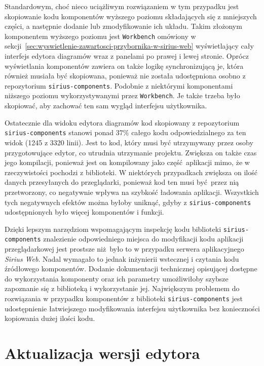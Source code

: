 Standardowym, choć nieco uciążliwym rozwiązaniem w tym przypadku jest
skopiowanie kodu komponentów wyższego poziomu składających się z mniejszych
części, a następnie dodanie lub zmodyfikowanie ich układu. Takim złożonym
komponentem wyższego poziomu jest \texttt{Workbench} omówiony w
sekcji~\ref{sec:wyswietlenie-zawartosci-przybornika-w-sirius-web} wyświetlający
cały interfejs edytora diagramów wraz z panelami po prawej i lewej stronie.
Oprócz wyświetlania komponentów zawiera on także logikę synchronizującą je,
która również musiała być skopiowana, ponieważ nie została udostępniona osobno
z repozytorium \texttt{sirius-components}. Podobnie z niektórymi komponentami
niższego poziomu wykorzystywanymi przez \texttt{Workbench}. Je także trzeba
było skopiować, aby zachować ten sam wygląd interfejsu użytkownika.

Ostatecznie dla widoku edytora diagramów kod skopiowany z repozytorium
\texttt{sirius-\allowbreak components} %
stanowi ponad $37\%$ całego kodu
odpowiedzialnego za ten widok (1245 z 3320 linii). Jest to kod, który musi być
utrzymywany przez osoby przygotowujące edytor, co utrudnia utrzymanie projektu.
Zwiększa on także czas jego kompilacji, ponieważ jest on kompilowany jako
część aplikacji mimo, że w rzeczywistości pochodzi z biblioteki. W niektórych
przypadkach zwiększa on ilość danych przesyłanych do przeglądarki, ponieważ kod
ten musi być przez nią przetworzony, co negatywnie wpływa na szybkość ładowania
aplikacji. Wszystkich tych negatywnych efektów można byłoby uniknąć, gdyby z
\texttt{sirius-components} udostępnionych było więcej komponentów i funkcji.

Dzięki lepszym narzędziom wspomagającym inspekcję kodu biblioteki
\texttt{sirius-components} znalezienie odpowiedniego miejsca do modyfikacji
kodu aplikacji przeglądarkowej jest prostsze niż było to w przypadku serwera
aplikacyjnego \emph{Sirius Web}. Nadal wymagało to jednak inżynierii wstecznej
i czytania kodu źródłowego komponentów. Dodanie dokumentacji technicznej
opisującej dostępne do wykorzystania komponenty oraz ich parametry umożliwiłoby
szybsze zapoznanie się z biblioteką i wykorzystanie jej. Największym problemem
do rozwiązania w przypadku komponentów z biblioteki \texttt{sirius-components}
jest udostępnienie łatwiejszego modyfikowania interfejsu użytkownika bez
konieczności kopiowania dużej ilości kodu.

\section{Aktualizacja wersji edytora}

